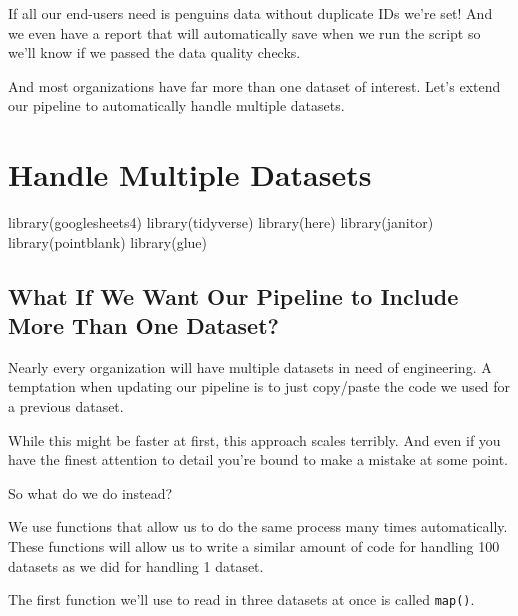 \documentclass[
  letterpaper,
  DIV=11,
  numbers=noendperiod]{scrreprt}
\newenvironment{Shaded}{\begin{snugshade}}{\end{snugshade}}
\newcommand{\FunctionTok}[1]{\textcolor[rgb]{0.28,0.35,0.67}{#1}}
\newcommand{\NormalTok}[1]{\textcolor[rgb]{0.00,0.23,0.31}{#1}}
\begin{document}
If all our end-users need is penguins data without duplicate IDs we're
set! And we even have a report that will automatically save when we run
the script so we'll know if we passed the data quality checks.

And most organizations have far more than one dataset of interest. Let's
extend our pipeline to automatically handle multiple datasets.


\hypertarget{handle-multiple-datasets}{%
\chapter{Handle Multiple Datasets}\label{handle-multiple-datasets}}

\begin{Shaded}
\begin{Highlighting}[]
\FunctionTok{library}\NormalTok{(googlesheets4)}
\FunctionTok{library}\NormalTok{(tidyverse)}
\FunctionTok{library}\NormalTok{(here)}
\FunctionTok{library}\NormalTok{(janitor)}
\FunctionTok{library}\NormalTok{(pointblank)}
\FunctionTok{library}\NormalTok{(glue)}
\end{Highlighting}
\end{Shaded}

\hypertarget{what-if-we-want-our-pipeline-to-include-more-than-one-dataset}{%
\section{What If We Want Our Pipeline to Include More Than One
Dataset?}\label{what-if-we-want-our-pipeline-to-include-more-than-one-dataset}}

Nearly every organization will have multiple datasets in need of
engineering. A temptation when updating our pipeline is to just
copy/paste the code we used for a previous dataset.

While this might be faster at first, this approach scales terribly. And
even if you have the finest attention to detail you're bound to make a
mistake at some point.

So what do we do instead?

We use functions that allow us to do the same process many times
automatically. These functions will allow us to write a similar amount
of code for handling 100 datasets as we did for handling 1 dataset.

The first function we'll use to read in three datasets at once is called
\texttt{map()}.
\end{document}
